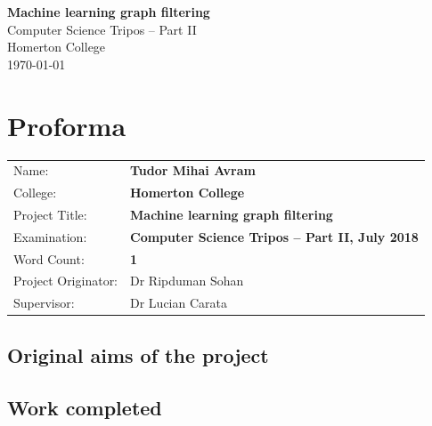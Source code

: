 \documentclass[12pt,a4paper,twoside,openright]{report}
\begin{document}



\pagestyle{empty}


\vspace*{60mm}
\begin{center}
	\Huge
	\textbf{Machine learning graph filtering} \\[5mm]
	Computer Science Tripos -- Part II \\[5mm]
	Homerton College \\[5mm]
	\today  %
\end{center}


\pagestyle{plain}

\chapter*{Proforma}

{\large
	\begin{tabular}{ll}
		Name:               & \bf Tudor Mihai Avram                     \\
		College:            & \bf Homerton College                    \\
		Project Title:      & \bf Machine learning graph filtering \\
		Examination:        & \bf Computer Science Tripos -- Part II, July 2018  \\
		Word Count:         & \bf 1\footnotemark[1] \\
		Project Originator: & Dr Ripduman Sohan                   \\
		Supervisor:         & Dr Lucian Carata                    \\ 
	\end{tabular}
}


\section*{Original aims of the project}
\section*{Work completed}
\end{document}
